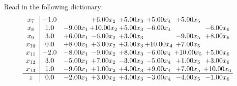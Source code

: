 \documentclass[9pt]{article}
\begin{document}
Read in the following dictionary:
\[\begin{array}{c| c c@{\hskip 2pt} c@{\hskip 2pt} c@{\hskip 2pt} c@{\hskip 2pt} c@{\hskip 2pt} c@{\hskip 2pt} }
 x_{7}   &  -1.0  &   & +  6.00 x_{2} & +  5.00 x_{3} & +  5.00 x_{4} & +  5.00 x_{5} &   \\
 x_{8}   &  1.0 & -9.00 x_{1} & + 10.00 x_{2} & +  5.00 x_{3} & -6.00 x_{4} &   & -6.00 x_{6}\\
 x_{9}   &  3.0 & +  6.00 x_{1} & -6.00 x_{2} & +  3.00 x_{3} &   & -9.00 x_{5} & +  8.00 x_{6}\\
 x_{10}   &  0.0 & +  8.00 x_{1} & +  3.00 x_{2} & +  3.00 x_{3} & + 10.00 x_{4} & +  7.00 x_{5} &   \\
 x_{11}   &  -2.0 & -8.00 x_{1} & -9.00 x_{2} & +  8.00 x_{3} & -6.00 x_{4} & + 10.00 x_{5} & +  5.00 x_{6}\\
 x_{12}   &  3.0 & -5.00 x_{1} & +  7.00 x_{2} & -3.00 x_{3} & -5.00 x_{4} & +  1.00 x_{5} & +  3.00 x_{6}\\
 x_{13}   &  1.0 & -9.00 x_{1} & +  1.00 x_{2} & +  4.00 x_{3} & +  9.00 x_{4} & +  7.00 x_{5} & + 10.00 x_{6}\\
\hline
z    &  0.0 & -2.00 x_{1} & +  3.00 x_{2} & +  4.00 x_{3} & -3.00 x_{4} & -4.00 x_{5} & -1.00 x_{6}\\
\end{array}\]
\end{document}
